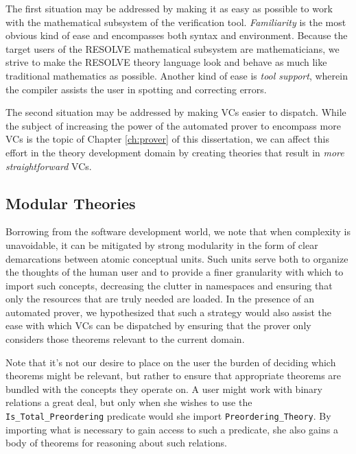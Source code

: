 The first situation may be addressed by making it as easy as possible to work with the mathematical subsystem of the verification tool.  \emph{Familiarity} is the most obvious kind of ease and encompasses both syntax and environment.  Because the target users of the RESOLVE mathematical subsystem are mathematicians, we strive to make the RESOLVE theory language look and behave as much like traditional mathematics as possible.  Another kind of ease is \emph{tool support}, wherein the compiler assists the user in spotting and correcting errors.

The second situation may be addressed by making VCs easier to dispatch.  While the subject of increasing the power of the automated prover to encompass more VCs is the topic of Chapter \ref{ch:prover} of this dissertation, we can affect this effort in the theory development domain by creating theories that result in \emph{more straightforward} VCs.

	\subsection{Modular Theories\label{modularTheories}}

Borrowing from the software development world, we note that when complexity is unavoidable, it can be mitigated by strong modularity in the form of clear demarcations between atomic conceptual units.   Such units serve both to organize the thoughts of the human user and to provide a finer granularity with which to import such concepts, decreasing the clutter in namespaces and ensuring that only the resources that are truly needed are loaded.  In the presence of an automated prover, we hypothesized that such a strategy would also assist the ease with which VCs can be dispatched by ensuring that the prover only considers those theorems relevant to the current domain.

Note that it's not our desire to place on the user the burden of deciding which theorems might be relevant, but rather to ensure that appropriate theorems are bundled with the concepts they operate on.  A user might work with binary relations a great deal, but only when she wishes to use the \texttt{Is\_Total\_Preordering} predicate would she import \texttt{Preordering\_Theory}.  By importing what is necessary to gain access to such a predicate, she also gains a body of theorems for reasoning about such relations.

